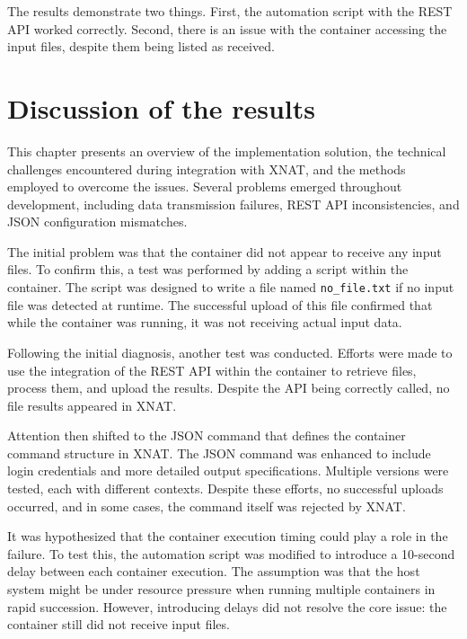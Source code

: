 The results demonstrate two things. First, the automation script with the REST API worked correctly. Second, there is an issue with the container accessing the input files, despite them being listed as received.

\section{Discussion of the results}
This chapter presents an overview of the implementation solution, the technical challenges encountered during integration with XNAT, and the methods employed to overcome the issues. Several problems emerged throughout development, including data transmission failures, REST API inconsistencies, and JSON configuration mismatches.

The initial problem was that the container did not appear to receive any input files. To confirm this, a test was performed by adding a script within the container. The script was designed to write a file named \texttt{no\_file.txt} if no input file was detected at runtime. The successful upload of this file confirmed that while the container was running, it was not receiving actual input data.

Following the initial diagnosis, another test was conducted. Efforts were made to use the integration of the REST API within the container to retrieve files, process them, and upload the results. Despite the API being correctly called, no file results appeared in XNAT. 

Attention then shifted to the JSON command that defines the container command structure in XNAT. The JSON command was enhanced to include login credentials and more detailed output specifications. Multiple versions were tested, each with different contexts. Despite these efforts, no successful uploads occurred, and in some cases, the command itself was rejected by XNAT. 

It was hypothesized that the container execution timing could play a role in the failure. To test this, the automation script was modified to introduce a 10-second delay between each container execution. The assumption was that the host system might be under resource pressure when running multiple containers in rapid succession. However, introducing delays did not resolve the core issue: the container still did not receive input files.



